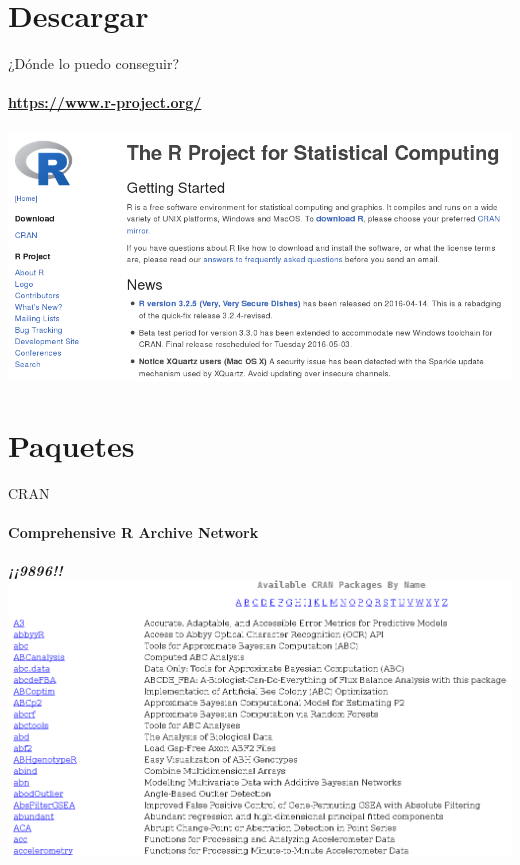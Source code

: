 \documentclass[12pt]{beamer}
\begin{document}
\section{Descargar}
\begin{frame}{¿Dónde lo puedo conseguir?}
\framesubtitle{\url{https://www.r-project.org/}}
\begin{center}
\href{https://www.r-project.org/}{\includegraphics[scale=0.44]{images/image2}}
\end{center}
\end{frame}
\section{Paquetes}
\begin{frame}{CRAN}
\framesubtitle{Comprehensive R Archive Network}
\begin{center}
\textbf{\emph{¡¡9896!!}}
\
\
\href{https://cran.r-project.org/web/packages/available_packages_by_name.html}{\includegraphics[scale=0.3]{images/image3}}
\end{center}
\end{frame}
\end{document}
